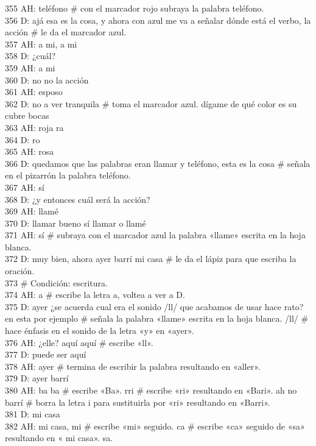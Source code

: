 355 AH: teléfono \# con el marcador rojo subraya la palabra teléfono.\\
356 D: ajá esa es la cosa, y ahora con azul me va a señalar dónde está el verbo, la acción \# le da el marcador azul.\\
357 AH: a mi, a mi\\
358 D: ¿cuál?\\
359 AH: a mi\\
360 D: no no la acción\\
361 AH: esposo\\
362 D: no a ver tranquila \# toma el marcador azul. dígame de qué color es su cubre bocas\\
363 AH: roja ra\\
364 D: ro\\
365 AH: rosa\\
366 D: quedamos que las palabras eran llamar y teléfono, esta es la cosa \# señala en el pizarrón la palabra teléfono.\\
367 AH: sí\\
368 D: ¿y entonces cuál será la acción?\\
369 AH: llamé\\
370 D: llamar bueno sí llamar o llamé\\
371 AH: sí \# subraya con el marcador azul la palabra «llame» escrita en la hoja blanca.\\
372 D: muy bien, ahora ayer barrí mi casa \# le da el lápiz para que escriba la oración.\\
373 \# Condición: escritura.\\
374 AH: a \# escribe la letra a, voltea a ver a D.\\
375 D: ayer ¿se acuerda cual era el sonido /ll/ que acabamos de usar hace rato? en esta por ejemplo \# señala la palabra «llame» escrita en la hoja blanca. /ll/ \# hace énfasis en el sonido de la letra «y» en «ayer».\\
376 AH: ¿elle? aquí aquí \# escribe «ll».\\
377 D: puede ser aquí\\
378 AH: ayer \# termina de escribir la palabra resultando en «aller».\\
379 D: ayer barrí\\
380 AH: ba ba \# escribe «Ba». rri \# escribe «ri» resultando en «Bari». ah no barrí \# borra la letra i para sustituirla por «ri» resultando en «Barri».\\
381 D: mi casa\\
382 AH: mi casa, mi \# escribe «mi» seguido. ca \# escribe «ca» seguido de «sa» resultando en « mi casa». sa.\\
